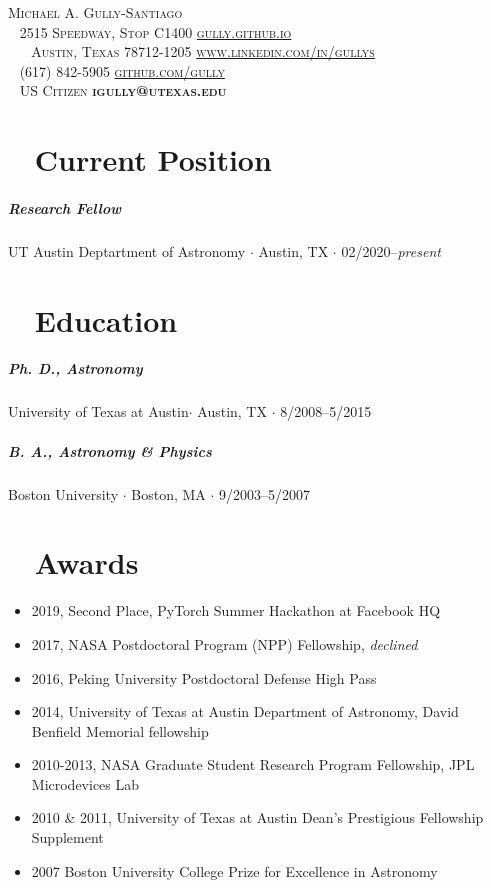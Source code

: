 \documentclass[10pt,letterpaper]{article}
\newcommand{\namestyle}{\Huge \scshape}
\newcommand{\addressstyle}{\color{addresscolor}  \footnotesize \sffamily \upshape}
\begin{document}
\begin{flushleft}
    \namestyle Michael A. Gully-Santiago \\[0.3em]
    \addressstyle
    \faMapMarked* ~ 2515 Speedway, Stop C1400  \hfill \url{gully.github.io} ~ \faLink \\
    ~ ~ Austin, Texas 78712-1205  \hfill  \url{www.linkedin.com/in/gullys} ~ \faLinkedinIn \\
    \faPhone ~ (617) 842-5905 \hfill \url{github.com/gully} ~ \faGithub \\
    \faFlagUsa ~ US Citizen \hfill \textbf{igully@utexas.edu} ~ \faAt\\

\end{flushleft}

\small

\section*{\faToggleOn ~ Current Position}

\subparagraph{Research Fellow}
UT Austin Deptartment of Astronomy $\cdot$ Austin, TX $\cdot$ 02/2020--\emph{present}

\section*{\faGraduationCap ~ Education}

\subparagraph{Ph. D., Astronomy}
University of Texas at Austin$\cdot$ Austin, TX $\cdot$ 8/2008--5/2015

\subparagraph{B. A., Astronomy \& Physics}
Boston University $\cdot$ Boston, MA $\cdot$ 9/2003--5/2007


\section*{\faTrophy ~ Awards}

\begin{itemize}
    \item 2019, Second Place, PyTorch Summer Hackathon at Facebook HQ
    \item 2017, NASA Postdoctoral Program (NPP) Fellowship,  \emph{declined}
    \item 2016, Peking University Postdoctoral Defense High Pass
    \item 2014, University of Texas at Austin Department of Astronomy, David Benfield Memorial fellowship
    \item 2010-2013, NASA Graduate Student Research Program Fellowship, JPL Microdevices Lab
    \item 2010 \& 2011, University of Texas at Austin Dean's Prestigious Fellowship Supplement
    \item 2007 Boston University College Prize for Excellence in Astronomy
\end{itemize}
\end{document}
